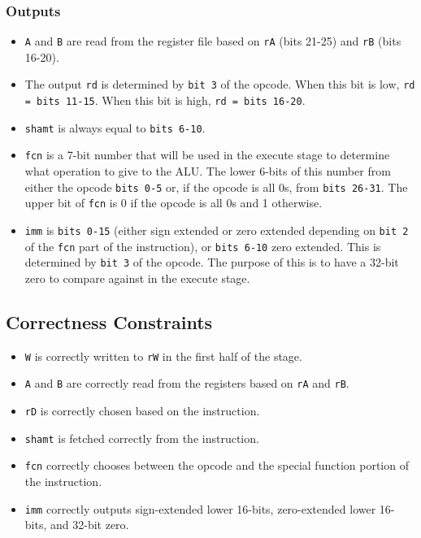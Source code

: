 \documentclass[10pt]{article}
\begin{document}
\subsubsection{Outputs}
\begin{itemize}
\item \texttt{A} and \texttt{B} are read from the register file based on \texttt{rA} (bits 21-25) and \texttt{rB} (bits 16-20).
\item The output \texttt{rd} is determined by \texttt{bit 3} of the opcode. When this bit is low, \texttt{rd = bits 11-15}. When this bit is high, \texttt{rd = bits 16-20}.
\item \texttt{shamt} is always equal to \texttt{bits 6-10}.
\item \texttt{fcn} is a 7-bit number that will be used in the execute stage to determine what operation to give to the ALU.
  The lower 6-bits of this number from either the opcode \texttt{bits 0-5} or, if the opcode is all 0s, from \texttt{bits 26-31}.
  The upper bit of \texttt{fcn} is 0 if the opcode is all 0s and 1 otherwise.
\item \texttt{imm} is \texttt{bits 0-15} (either sign extended or zero extended depending on \texttt{bit 2} of the \texttt{fcn} part of the instruction),
  or \texttt{bits 6-10} zero extended. This is determined by \texttt{bit 3} of the opcode.
  The purpose of this is to have a 32-bit zero to compare against in the execute stage.
\end{itemize}

\subsection{Correctness Constraints}
\begin{itemize}
\item \texttt{W} is correctly written to \texttt{rW} in the first half of the stage. 
\item \texttt{A} and \texttt{B} are correctly read from the registers based on \texttt{rA} and \texttt{rB}.
\item \texttt{rD} is correctly chosen based on the instruction. 
\item \texttt{shamt} is fetched correctly from the instruction.
\item \texttt{fcn} correctly chooses between the opcode and the special function portion of the instruction.
\item \texttt{imm} correctly outputs sign-extended lower 16-bits, zero-extended lower 16-bits, and 32-bit zero.
\end{itemize}
\end{document}
